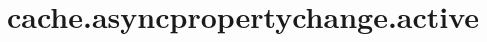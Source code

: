 \section{cache.asyncpropertychange.active}
\label{configuration:CacheAsyncpropertychangeActive}
\AvailableInJavaAndCsharp{\TODO}